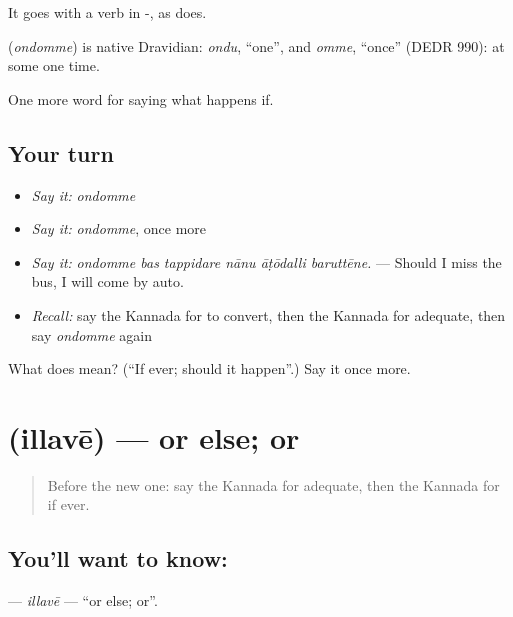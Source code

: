 It goes with a verb in -, as   does.

\begin{cousinweb}
\textbf{} (\emph{ondomme}) is native Dravidian: \emph{ondu}, \textquotedblleft{}one\textquotedblright{}, and \emph{omme}, \textquotedblleft{}once\textquotedblright{} (DEDR 990): at some one time.
\end{cousinweb}

\begin{grammarlens}[title={What you've built}]
One more word for saying what happens if.
\end{grammarlens}

\subsection*{Your turn}
\begin{itemize}
\raggedright
  \item \emph{Say it:} \emph{ondomme}
  \item \emph{Say it:} \emph{ondomme}, once more
  \item \emph{Say it:} \emph{ondomme bas tappidare nānu āṭōdalli baruttēne.} — Should I miss the bus, I will come by auto.
  \item \emph{Recall:} say the Kannada for to convert, then the Kannada for adequate, then say \emph{ondomme} again
\end{itemize}

\begin{tcolorbox}[breakable,colback=teal!4,colframe=teal!35!black,title={Before you move on}]
What does  mean? (\textquotedblleft{}If ever; should it happen\textquotedblright{}.) Say it once more.
\end{tcolorbox}
\section[\texorpdfstring{\kn{ಇಲ್ಲವೇ} (illavē)}{ಇಲ್ಲವೇ (illavē)}]{ (illavē) — or else; or}

\label{lesson:KA-C428-illave}



\begin{quote}
Before the new one: say the Kannada for adequate, then the Kannada for if ever.
\end{quote}

\subsection*{You'll want to know: }
\textbf{} — \emph{illavē} — \textquotedblleft{}or else; or\textquotedblright{}.

